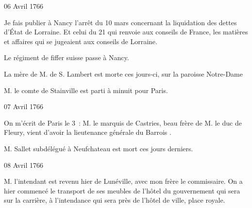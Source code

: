                      \begin{diary}{06 Avril 1766}{}
                        
                         Je fais publier à Nancy l'arrêt du
                           10 mars concernant la liquidation
                           des dettes d’État de Lorraine. Et celui du
                           21 qui renvoie aux conseils de France,
                           les matières et affaires qui se jugeaient
                           aux conseils de Lorraine. \bigskip
        
        
                         Le régiment de fiffer suisse passe à Nancy. \bigskip
        
        
                        
                           La mère de M. de S. Lambert
                           est morte ces jours-ci, sur
                              la paroisse Notre-Dame
                        \bigskip
        
        
                        
                           M. le comte de Stainville est
                           parti à
                           minuit pour Paris. \bigskip
        
        
                     \end{diary}

                     \begin{diary}{07 Avril 1766}{}
                        
                         On m'écrit de Paris
                           le 3 : \og M. le marquis de
                                 Castries, beau frère de M. le duc de Fleury,
                              vient d'avoir la lieutenance générale du
                              Barrois \fg{}. \bigskip
        
        
                        
                           M. Sallet
                           subdélégué à Neufchateau est
                           mort ces jours derniers. \bigskip
        
        
                     \end{diary}

                     \begin{diary}{08 Avril 1766}{}
                        
                        
                           M. l'intendant est revenu hier de
                              Lunéville, avec
                           mon frère le commissaire. On a hier commencé
                           le transport de ses meubles de l'hôtel du gouvernement
                           qui sera sur la carrière, à l'intendance
                           qui sera
                           près de l'hôtel de
                              ville,
                              place royale.
                        \bigskip
        
        
                     \end{diary}

